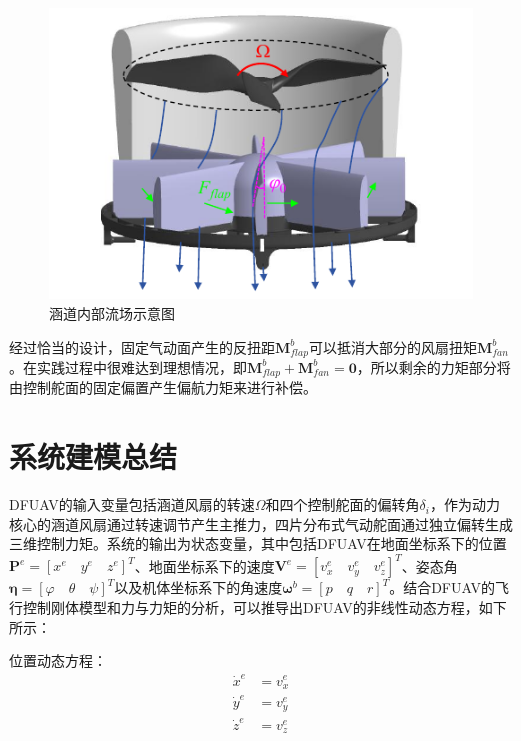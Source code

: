 \begin{figure}[htbp]
	\centering
	\begin{minipage}[c]{1\textwidth} 
		\centering
		\includegraphics[scale=1]{Fig/固定气动面.pdf}
	\end{minipage}%
    \caption{\label{固定气动面}涵道内部流场示意图}
\end{figure}

经过恰当的设计，固定气动面产生的反扭距$\boldsymbol{M}_{flap}^b$可以抵消大部分的风扇扭矩$\boldsymbol{M}_{fan}^b$。在实践过程中很难达到理想情况，即$\boldsymbol{M}_{flap}^b + \boldsymbol{M}_{fan}^b = \boldsymbol{0}$，所以剩余的力矩部分将由控制舵面的固定偏置产生偏航力矩来进行补偿。

\section{系统建模总结}

DFUAV的输入变量包括涵道风扇的转速$\Omega$和四个控制舵面的偏转角$\delta_i$，作为动力核心的涵道风扇通过转速调节产生主推力，四片分布式气动舵面通过独立偏转生成三维控制力矩。系统的输出为状态变量，其中包括DFUAV在地面坐标系下的位置$\boldsymbol{P}^{e}=[{x}^{e} \quad {y}^{e} \quad {z}^{e}]^{T}$、地面坐标系下的速度$\boldsymbol{V}^{e}=[{v}^{e}_{x} \quad {v}^{e}_{y} \quad {v}^{e}_{z}]^{T}$、姿态角$\boldsymbol{\eta}=[\varphi \quad \theta \quad \psi]^T$以及机体坐标系下的角速度$\boldsymbol{\omega}^b=[p \quad q \quad r]^T$。结合DFUAV的飞行控制刚体模型和力与力矩的分析，可以推导出DFUAV的非线性动态方程，如下所示：

位置动态方程：
\begin{equation}
    \begin{aligned}
        \dot{x}^{e}&=v_x^e\\
        \dot{y}^{e}&=v_y^e\\
        \dot{z}^{e}&=v_z^e
    \end{aligned}
    \label{eq_40}
\end{equation}

